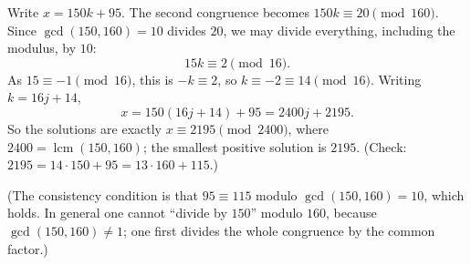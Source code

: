Write $x=150k+95$. The second congruence becomes $150k\equiv20\pmod{160}$. Since $\gcd(150,160)=10$ divides $20$, we may divide everything, including the modulus, by $10$:
\[
15k\equiv2\pmod{16}.
\]
As $15\equiv-1\pmod{16}$, this is $-k\equiv2$, so $k\equiv-2\equiv14\pmod{16}$. Writing $k=16j+14$,
\[
x=150(16j+14)+95=2400j+2195 .
\]
So the solutions are exactly $\boxed{x\equiv2195\pmod{2400}}$, where $2400=\operatorname{lcm}(150,160)$; the smallest positive solution is $2195$. (Check: $2195=14\cdot150+95=13\cdot160+115$.)

(The consistency condition is that $95\equiv115$ modulo $\gcd(150,160)=10$, which holds. In general one cannot ``divide by $150$'' modulo $160$, because $\gcd(150,160)\ne1$; one first divides the whole congruence by the common factor.)
